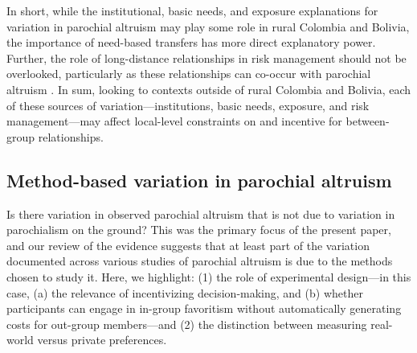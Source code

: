 \documentclass[bibauthoryear]{aa}
\begin{document}
In short, while the institutional, basic needs, and exposure explanations for variation in parochial altruism may play some role in rural Colombia and Bolivia, the importance of need-based transfers  has more direct explanatory power. Further, the role of long-distance relationships in risk management should not be overlooked, particularly as these relationships can co-occur with parochial altruism  \citep{bollig1993intra, brewer1976ethnocentrism, lathrap1973antiquity, bowles2004persistent}. %
In sum, looking to contexts outside of rural Colombia and Bolivia, each of these sources of variation---institutions, basic needs, exposure, and risk management---may affect local-level constraints on and incentive for between-group relationships.

\subsection{Method-based variation in parochial altruism}

Is there variation in observed parochial altruism that is not due to variation in parochialism on the ground? This was the primary focus of the present paper, and our review of the evidence suggests that at least part of the variation documented across various studies of parochial altruism is due to the methods chosen to study it. Here, we highlight: (1) the role of experimental design---in this case, (a) the relevance of incentivizing decision-making, and (b) whether participants can engage in in-group favoritism without automatically generating costs for out-group members---and (2) the distinction between measuring real-world versus private preferences.
\end{document}
